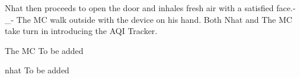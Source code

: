 \documentclass{screenplay}
\begin{document}
Nhat then proceeds to open the door and inhales fresh air with a satisfied face.-\_- 
\newline
\newline
\newline
\newline
\newline
{}
The MC walk outside with the device on his hand. Both Nhat and The MC take turn in introducing the AQI Tracker.

\begin{dialogue}{The MC}
To be added
\end{dialogue}

\begin{dialogue}{nhat}
To be added
\end{dialogue}
\end{document}
